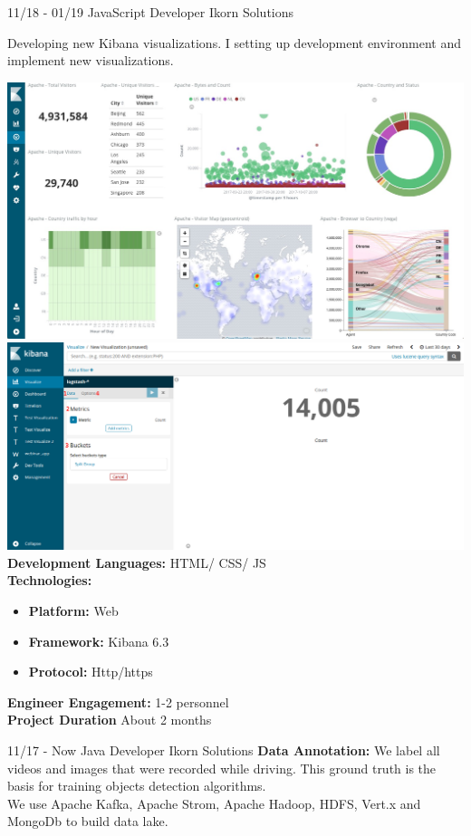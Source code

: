 \documentclass[]{friggeri-cv}
\begin{document}
\begin{entrylist}
  \entry
    {11/18 - 01/19}
    {JavaScript Developer}
    {Ikorn Solutions}
    {Developing new Kibana visualizations. I setting up development environment and implement new visualizations. 

	\includegraphics[scale=0.08]{img/kibana_01.jpg} \hspace{2cm}
	\includegraphics[scale=0.1]{img/kibana.png}\\
	
	\textbf{Development Languages:} HTML/ CSS/ JS~\\
	 \textbf{Technologies:}~
			\begin{itemize}
				\item \textbf{Platform:}  Web
				\item \textbf{Framework:} Kibana 6.3
				\item \textbf{Protocol:} Http/https
			\end{itemize}
	 \textbf{Engineer Engagement:} 1-2 personnel\\
	 \textbf{Project Duration} About 2 months
     }
\end{entrylist}

\begin{entrylist}
\entry
    {11/17 - Now}
    {Java Developer}
    {Ikorn Solutions}
	{\textbf{ Data Annotation: } We label all videos and images that were recorded while driving. This ground truth is the basis for training objects detection algorithms.\\
	We use Apache Kafka, Apache Strom, Apache Hadoop, HDFS, Vert.x and MongoDb to build data lake.\\

}
\end{entrylist}
\end{document}
